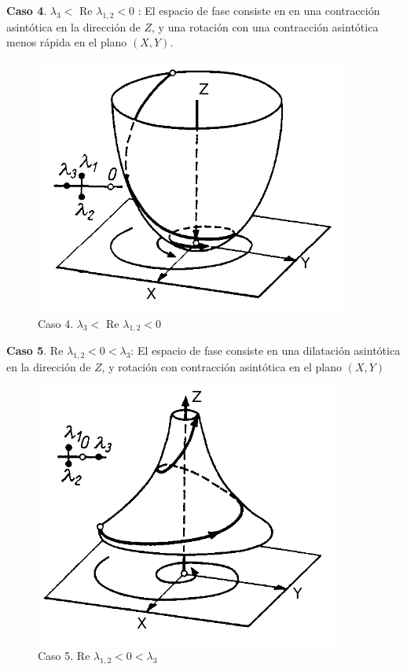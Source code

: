 \documentclass[a4paper,10pt]{article}
\numberwithin{equation}{section}
\begin{document}
\textbf{Caso 4}. $\lambda_3 <$ Re $\lambda_{1,2} < 0$ : El espacio de fase consiste en en una contracción asintótica
en la dirección de $Z$, y una rotación con una contracción asintótica menos rápida en el plano
$(X,Y)$.

\begin{figure}[H]
 \centering
\includegraphics[scale=0.35]{problema3fig5}
\caption{Caso 4. $\lambda_3 <$ Re $\lambda_{1,2} < 0$}
\label{fig:problema3fig5}
\end{figure}
\vspace{.3cm}

\textbf{Caso 5}. Re $\lambda_{1,2} < 0 < \lambda_3$: El espacio de fase consiste en una dilatación asintótica
en la dirección de $Z$, y rotación con contracción asintótica en el plano $(X,Y)$

\begin{figure}[H]
 \centering
\includegraphics[scale=0.35]{problema3fig6}
\caption{Caso 5. Re $\lambda_{1,2} < 0 < \lambda_3$}
\label{fig:problema3fig6}
\end{figure}
\vspace{.3cm}
\end{document}
